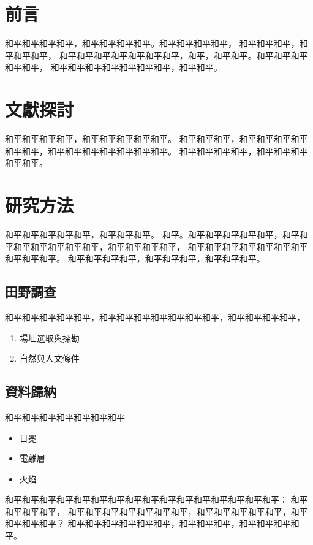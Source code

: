 \documentclass[12pt]{article}
\begin{document}
	
\section{前言}
和平和平和平和平，和平和平和平和平。和平和平和平和平，
和平和平和平，和平和平和平，
和平和平和平和平和平和平和平，和平，和平和平。和平和平和平和平和平，
和平和平和平和平和平和平和平，和平和平。


\section{文獻探討}
和平和平和平和平，和平和平和平和平和平。
和平和平和平，和平和平和平和平和平和平，和平和平和平和平和平和平和平。
和平和平和平和平，和平和平和平和平和平\cite{_2022_}。


\section{研究方法}
和平和平和平和平和平，和平和平和平。
和平。和平和平和平和平和平，和平和平和平和平和平和平和平，和平和平和平和平，
和平和平和平和平和平和平和平和平和平和平。
和平和平和平和平，和平和平和平，和平和平和平。

\subsection{田野調查}
和平和平和平和平和平，和平和平和平和平和平和平和平，和平和平和平和平，

\begin{enumerate}
\item 場址選取與探勘
\item 自然與人文條件
\end{enumerate}


\subsection{資料歸納}
和平和平和平和平和平和平和平

\begin{itemize}
\item
日冕
\item
電離層
\item
火焰
\end{itemize}

和平和平和平和平和平和平和平和平和平和平和平和平和平和平和平和平：
和平和平和平和平，
和平和平和平和平和平和平和平，和平和平和平和平和平，和平和平和平和平？
和平和平和平和平和平和平，和平和平和平，和平和平和平和平。
\end{document}

